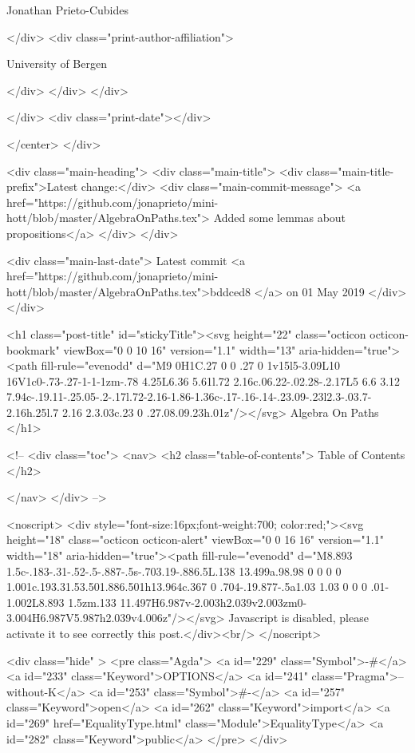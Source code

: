                   Jonathan Prieto-Cubides
                
              </div>
              <div class="print-author-affiliation">
                
                  University of Bergen
                
                </div>
            </div>
          </div>
          
          
        </div>
        <div class="print-date"></div>
        
        
    </center>
  </div>

  
  <div class="main-heading">
    <div class="main-title">
      <div class="main-title-prefix">Latest change:</div>
      <div class="main-commit-message">
            <a href="https://github.com/jonaprieto/mini-hott/blob/master/AlgebraOnPaths.tex">
              Added some lemmas about propositions</a>
      </div>
    </div>

    <div class="main-last-date">
      Latest commit <a href="https://github.com/jonaprieto/mini-hott/blob/master/AlgebraOnPaths.tex">bddced8 </a> on  01 May 2019
    </div>
  </div>
  
  <h1 class="post-title" id="stickyTitle"><svg height="22" class="octicon octicon-bookmark" viewBox="0 0 10 16" version="1.1" width="13" aria-hidden="true"><path fill-rule="evenodd" d="M9 0H1C.27 0 0 .27 0 1v15l5-3.09L10 16V1c0-.73-.27-1-1-1zm-.78 4.25L6.36 5.61l.72 2.16c.06.22-.02.28-.2.17L5 6.6 3.12 7.94c-.19.11-.25.05-.2-.17l.72-2.16-1.86-1.36c-.17-.16-.14-.23.09-.23l2.3-.03.7-2.16h.25l.7 2.16 2.3.03c.23 0 .27.08.09.23h.01z"/></svg> Algebra On Paths
  </h1>

  <!-- 
  <div class="toc">
    <nav>
    <h2 class="table-of-contents"> Table of Contents </h2>
      

    </nav>
  </div>
   -->

  <noscript>
  <div style="font-size:16px;font-weight:700; color:red;"><svg height="18" class="octicon octicon-alert" viewBox="0 0 16 16" version="1.1" width="18" aria-hidden="true"><path fill-rule="evenodd" d="M8.893 1.5c-.183-.31-.52-.5-.887-.5s-.703.19-.886.5L.138 13.499a.98.98 0 0 0 0 1.001c.193.31.53.501.886.501h13.964c.367 0 .704-.19.877-.5a1.03 1.03 0 0 0 .01-1.002L8.893 1.5zm.133 11.497H6.987v-2.003h2.039v2.003zm0-3.004H6.987V5.987h2.039v4.006z"/></svg> Javascript is disabled, please activate it to see correctly this post.</div><br/>
  </noscript>

  <div class="hide" >
<pre class="Agda">
<a id="229" class="Symbol">{-#</a> <a id="233" class="Keyword">OPTIONS</a> <a id="241" class="Pragma">--without-K</a> <a id="253" class="Symbol">#-}</a>
<a id="257" class="Keyword">open</a> <a id="262" class="Keyword">import</a> <a id="269" href="EqualityType.html" class="Module">EqualityType</a> <a id="282" class="Keyword">public</a>
</pre>
</div>

